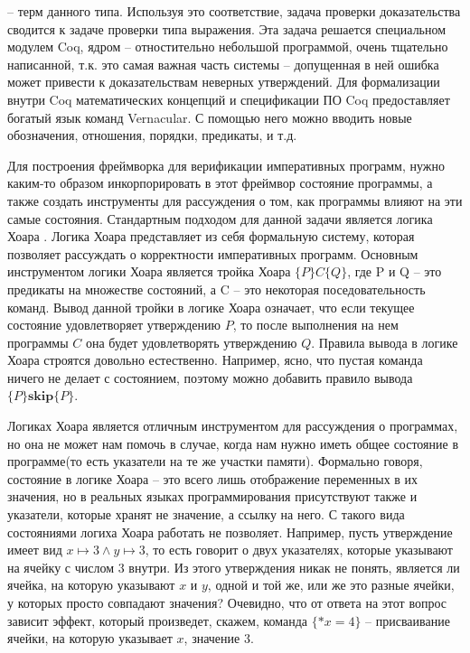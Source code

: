 -- терм данного типа. Используя это соответствие, задача проверки доказательства сводится к задаче проверки типа выражения. Эта задача
решается специальном модулем Coq, ядром -- отностительно небольшой программой, очень тщательно написанной, т.к. это самая важная часть
системы -- допущенная в ней ошибка может привести к доказательствам неверных утверждений.
Для формализации внутри Coq математических концепций и спецификации ПО Coq предоставляет богатый язык команд Vernacular.
С помощью него можно вводить новые обозначения, отношения, порядки, предикаты, и т.д.
\par
Для построения фреймворка для верификации императивных программ, нужно каким-то образом инкорпорировать в этот фреймвор состояние программы,
а также создать инструменты для рассуждения о том, как программы влияют на эти самые состояния. Стандартным подходом для данной задачи
является логика Хоара \cite{Hoare}. Логика Хоара представляет из себя формальную систему, которая позволяет рассуждать о корректности
императивных программ. Основным инструментом логики Хоара является тройка Хоара $\{P\}C\{Q\}$, где P и Q -- это предикаты на множестве состояний,
а C -- это некоторая поседовательность команд. Вывод данной тройки в логике Хоара означает, что если текущее состояние удовлетворяет
утверждению $P$, то после выполнения на нем программы $C$ она будет удовлетворять утверждению $Q$. Правила вывода в логике Хоара
строятся довольно естественно. Например, ясно, что пустая команда ничего не делает с состоянием, поэтому можно добавить правило вывода
$\{P\}\textbf{skip}\{P\}$.
\par
Логиках Хоара является отличным инструментом для рассуждения о программах, но она не может нам помочь в случае, когда нам нужно иметь
общее состояние в программе(то есть указатели на те же участки памяти). Формально говоря, состояние в логике Хоара -- это всего лишь
отображение переменных в их значения, но в реальных языках программирования присутствуют также и указатели, которые хранят не значение,
а ссылку на него. С такого вида состояниями логиха Хоара работать не позволяет. Например, пусть утверждение имеет вид
$x \mapsto 3 \land y \mapsto 3$, то есть говорит о двух указателях, которые указывают на ячейку с числом $3$ внутри. Из этого утверждения
никак не понять, является ли ячейка, на которую указывают $x$ и $y$, одной и той же, или же это разные ячейки, у которых просто
совпадают значения? Очевидно, что от ответа на этот вопрос зависит эффект, который произведет, скажем, команда $\{*x = 4\}$ -- присваивание
ячейки, на которую указывает $x$, значение 3.
